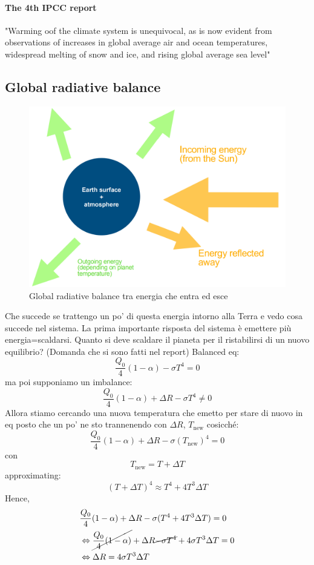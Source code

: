 \paragraph{The 4th IPCC report} \begin{center}
    "Warming oof the climate system is unequivocal, as is now evident from observations of increases in global average air and ocean temperatures, widespread melting of snow and ice, and rising global average sea level"
\end{center}
\subsection{Global radiative balance}
\begin{figure}[htpb]
    \centering
    \includegraphics[width=0.5\linewidth]{uploads/GRB.png}
    \caption{Global radiative balance tra energia che entra ed esce}
\end{figure}
Che succede se trattengo un po' di questa energia intorno alla Terra e vedo cosa succede nel sistema. La prima importante risposta del sistema è emettere più energia=scaldarsi. Quanto si deve scaldare il pianeta per il ristabilirsi di un nuovo equilibrio? (Domanda che si sono fatti nel report)
Balanced eq:
$$\frac{Q_0}{4}(1-\alpha)-\sigma T^4=0$$
ma poi supponiamo un imbalance:
$$\frac{Q_0}{4}(1-\alpha)+\Delta R-\sigma T^4\neq0$$
Allora stiamo cercando una nuova temperatura che emetto per stare di nuovo in eq posto che un po' ne sto trannenendo con $\Delta R$, $T_{\text{new}}$ cosicché:
\begin{equation}
    \frac{Q_0}{4}(1-\alpha)+\Delta R-\sigma (T_{\text{new}})^4=0
\end{equation}
con $$T_{\text{new}}=T+\Delta T$$
approximating:
$$(T+\Delta T)^4\approx T^4+4T^3\Delta T$$
Hence, 
\begin{equation}
\begin{split}
     & \frac{Q_0}{4}(1-\alpha)+\Delta R-\sigma ( T^4+4T^3\Delta T)=0\\
     & \Leftrightarrow \cancel{\frac{Q_0}{4}(1-\alpha)}+\Delta R\cancel{-\sigma  T^4}+4\sigma T^3\Delta T=0\\
     &\Leftrightarrow \Delta R=4\sigma T^3\Delta T
\end{split}
\end{equation}
